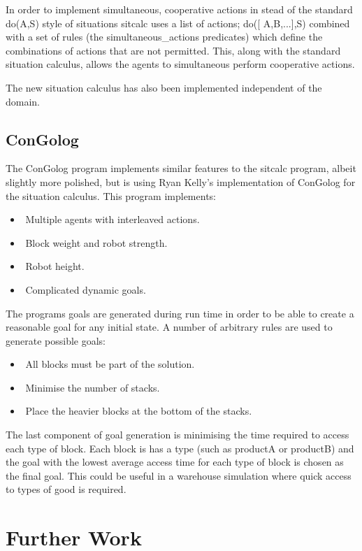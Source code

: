 \documentclass{article}
\begin{document}
In order to implement simultaneous, cooperative actions in stead of the
standard do(A,S) style of situations sitcalc uses a list of actions; do([ A,B,...],S)
combined with a set of rules (the simultaneous\_actions predicates) which define
the combinations of actions that are not permitted. This, along with the standard
situation calculus, allows the agents to simultaneous perform cooperative
actions.

The new situation calculus has also been implemented independent of the
domain.

\subsection{ConGolog}
The ConGolog program implements similar features to the sitcalc program,
albeit slightly more polished, but is using Ryan Kelly's implementation of ConGolog for the situation calculus.
This program implements:
\begin{itemize}
	\item Multiple agents with interleaved actions.
	\item Block weight and robot strength.
	\item Robot height.
	\item Complicated dynamic goals.
\end{itemize}

The programs goals are generated during run time in order to be able to
create a reasonable goal for any initial state. A number of arbitrary rules are
used to generate possible goals:
\begin{itemize}
	\item All blocks must be part of the solution.
	\item Minimise the number of stacks.
	\item Place the heavier blocks at the bottom of the stacks.
\end{itemize}

The last component of goal generation is minimising the time required to
access each type of block. Each block is has a type (such as productA or
productB) and the goal with the lowest average access time for each type of
block is chosen as the final goal. This could be useful in a warehouse simulation
where quick access to types of good is required.


\section{Further Work}
\end{document}
